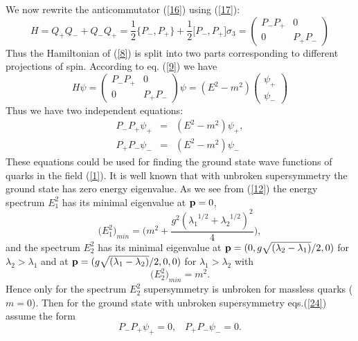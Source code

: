 \documentclass[a4paper,12pt,a4]{article}
\begin{document}
We now rewrite the anticommutator (\ref{16}) using (\ref{17}):
\begin{equation}
H=Q_+Q_-+Q_-Q_+=\frac{1}{2}\bigg\{P_-,P_+\bigg\}
+\frac{1}{2}\bigg[P_-,P_+\bigg]\sigma_3
=\left(\begin{array}{cc}P_-P_+&0\\
0 & P_+P_-\end{array}\right)
\label{22}
\end{equation}
Thus the Hamiltonian of (\ref{8}) is split into two
parts corresponding to different projections of spin.
According to eq. (\ref{9}) we have
\begin{equation}
H\psi=\left(\begin{array}{cc}P_-P_+ & 0\\
0 & P_+P_-\end{array}\right)\psi = (E^2-m^2)\left(\begin{array}{c}\psi_+ \\
\psi_-\end{array}\right)
\label{23}
\end{equation}
Thus we have two independent equations:
\begin{eqnarray}
P_-P_+\psi_+&=&(E^2-m^2)\psi_+,\nonumber\\
P_+P_-\psi_-&=&(E^2-m^2)\psi_-
\label{24}
\end{eqnarray}
These equations could be used for finding the ground state wave functions
of quarks in the field (\ref{1}).
It is well known that with unbroken supersymmetry
the ground state has zero energy eigenvalue. As we see from
(\ref{12}) the energy
spectrum $E^2_1$ has its minimal eigenvalue
at ${\bf p}=0$,
\begin{equation}
\bigg(E^2_1\bigg)_{min}=\bigg( m^2+\frac{g^2({\lambda_1}^{1/2}+{\lambda _2}
^{1/2})^2}{4}\bigg),
\label{25}
\end{equation}
and 
 the spectrum $E^2_2$ has its minimal eigenvalue at
${\bf p} = (0, g\sqrt{(\lambda_2-\lambda_1)}/2, 0)$
for $\lambda_2 > \lambda_1$ 
and at ${\bf p} = (g\sqrt{(\lambda_1-\lambda_2)}/2, 0, 0)$
for $\lambda_1> \lambda_2$ with
\begin{equation}
 \bigg(E^2_2\bigg)_{min} = m^2.
\label{26}
\end{equation}
Hence 
only for the spectrum $E^2_2$ supersymmetry is
unbroken for massless quarks ($m=0$).
Then for the ground state with unbroken supersymmetry
eqs.(\ref{24}) assume the form
\begin{equation}
P_-P_+\psi_+ = 0, \;\;\; P_+P_-\psi_- = 0. 
\label{27}
\end{equation}
\end{document}
